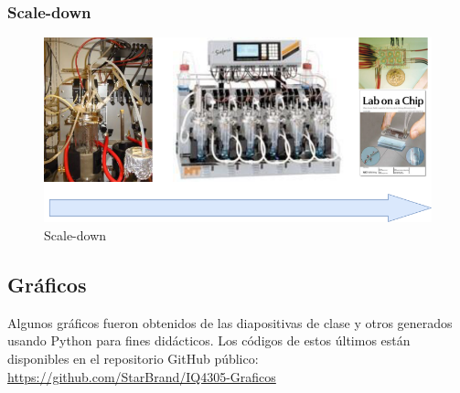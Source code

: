         \subsubsection{Scale-down}
        
        \begin{figure}
            \centering
            \includegraphics[width=\textwidth]{img/fotos/scale_down.png}
            \caption{Scale-down}
            \label{fig:scale_down}
        \end{figure}
        
        \begin{quote}
            \textit{}
        \end{quote}
            
\begin{anexo}

    \section{Gráficos}
    
    Algunos gráficos fueron obtenidos de las diapositivas de clase \cite{martinez_basterrechea_iq4305_2021} y otros generados usando Python para fines didácticos. Los códigos de estos últimos están disponibles en el repositorio GitHub público: \url{https://github.com/StarBrand/IQ4305-Graficos}
    
    
    
\end{anexo}
